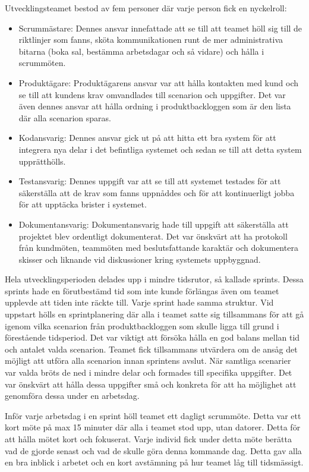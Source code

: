 Utvecklingsteamet bestod av fem personer där varje person fick en nyckelroll:

\begin{itemize}
  \item Scrummästare: Dennes ansvar innefattade att se till att teamet höll sig till de riktlinjer som fanns, sköta kommunikationen runt de mer administrativa bitarna (boka sal, bestämma arbetsdagar och så vidare) och hålla i scrummöten.
  \item Produktägare: Produktägarens ansvar var att hålla kontakten med kund och se till att kundens krav omvandlades till scenarion och uppgifter. Det var även dennes ansvar att hålla ordning i produktbackloggen som är den lista där alla scenarion sparas.
  \item Kodansvarig: Dennes ansvar gick ut på att hitta ett bra system för att integrera nya delar i det befintliga systemet och sedan se till att detta system upprätthölls.
  \item Testansvarig: Dennes uppgift var att se till att systemet testades för att säkerställa att de krav som fanns uppnåddes och för att kontinuerligt jobba för att upptäcka brister i systemet.
  \item Dokumentansvarig: Dokumentansvarig hade till uppgift att säkerställa att projektet blev ordentligt dokumenterat. Det var önskvärt att ha protokoll från kundmöten, teammöten med beslutsfattande karaktär och dokumentera skisser och liknande vid diskussioner kring systemets uppbyggnad.
\end{itemize}

Hela utvecklingsperioden delades upp i mindre tidsrutor, så kallade sprints. Dessa sprints hade en förutbestämd tid som inte kunde förlängas även om teamet upplevde att tiden inte räckte till. Varje sprint hade samma struktur. Vid uppstart hölls en sprintplanering där alla i teamet satte sig tillsammans för att gå igenom vilka scenarion från produktbackloggen som skulle ligga till grund i förestående tidsperiod. Det var viktigt att försöka hålla en god balans mellan tid och antalet valda scenarion. Teamet fick tillsammans utvärdera om de ansåg det möjligt att utföra alla scenarion innan sprintens avslut. När samtliga scenarier var valda bröts de ned i mindre delar och formades till specifika uppgifter. Det var önskvärt att hålla dessa uppgifter små och konkreta för att ha möjlighet att genomföra dessa under en arbetsdag.

Inför varje arbetsdag i en sprint höll teamet ett dagligt scrummöte. Detta var ett kort möte på max 15 minuter där alla i teamet stod upp, utan datorer. Detta för att hålla mötet kort och fokuserat. Varje individ fick under detta möte berätta vad de gjorde senast och vad de skulle göra denna kommande dag. Detta gav alla en bra inblick i arbetet och en kort avstämning på hur teamet låg till tidsmässigt.

